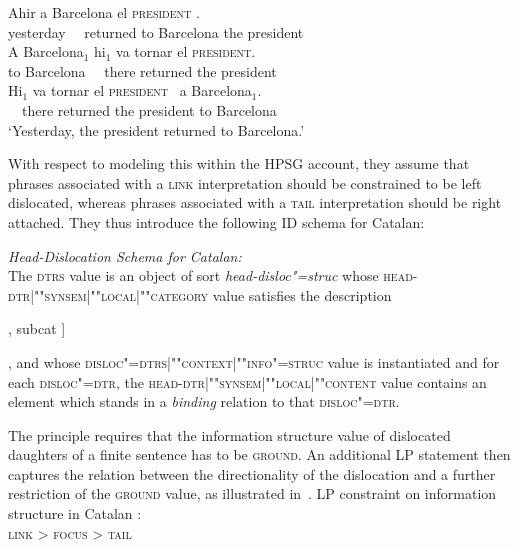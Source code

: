\documentclass[output=paper
                ,modfonts
                ,nonflat
	        ,collection
	        ,collectionchapter
	        ,collectiontoclongg
 	        ,biblatex
                ,babelshorthands
                ,newtxmath
                ,draftmode
                ,colorlinks, citecolor=brown
]{./langsci/langscibook}
\begin{document}
\begin{exe}
  \ex\label{ex:catalan}
  \begin{xlist}
    \ex\gll Ahir  a Barcelona el \textsc{president} \RF.\\
         yesterday \ \ returned to Barcelona the president\\
   \ex\gll  A Barcelona$_1$ \LF hi$_1$ {va tornar} el \textsc{president}\RF.\\
           to Barcelona \ \  there returned the president\\\label{ex:catalan-a}
           \ex\gll \LF Hi$_1$ {va tornar} el \textsc{president}\RF\ {} a Barcelona$_1$.\\
            \ \  there  returned the president to Barcelona\\\label{ex:catalan-b}
\trans `Yesterday, the president returned to Barcelona.'
  \end{xlist}
\end{exe}
 
With respect to modeling this within the HPSG account, they assume
that phrases associated with a \textsc{link} interpretation should be
constrained to be left dislocated, whereas phrases associated with a
\textsc{tail} interpretation should be right attached.
They thus introduce the following ID schema for Catalan:
\begin{sloppy}
\begin{exe}
\ex  \textit{Head-Dislocation Schema for Catalan:}\\
  The \textsc{dtrs} value is an object of sort
  \textit{head-disloc"=struc} whose
  \textsc{head-dtr|""syn\-sem|""local|""category} value satisfies the
  description\\
  \begin{avm} [head \type{verb} [vform \type{finite}], subcat \elst]
  \end{avm}, and whose
  \textsc{disloc"=dtrs|""context|""info"=struc} value is instantiated and
  for each \textsc{disloc"=dtr}, the
  \textsc{head-dtr|""synsem|""local|""content} value contains an element
  which stands in a \textit{binding} relation to that
  \textsc{disloc"=dtr}.
\end{exe}
\end{sloppy}

The principle requires that the information structure value of
dislocated daughters of a finite sentence has to be
\textsc{ground}. An additional LP statement then captures the relation
between the directionality of the dislocation and a further
restriction of the \textsc{ground} value, as illustrated in~.
\ea
LP constraint on information structure in Catalan  \citep{EV96a}:\\
  \centering
  \textsc{link} > \textsc{focus} > \textsc{tail}
\end{document}
